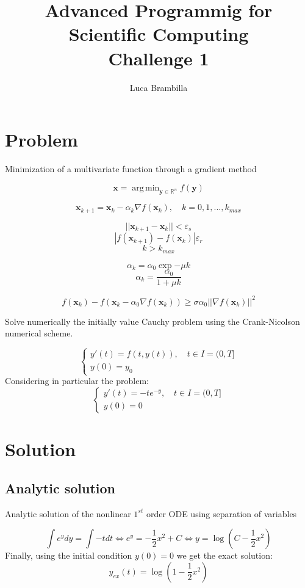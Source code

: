 \documentclass[]{article}
\title{Advanced Programmig for Scientific Computing\\Challenge 1}
\author{Luca Brambilla}
\DeclareMathOperator*{\argmin}{arg\,min}
\begin{document}
	
	\maketitle
	
	
\section{Problem}
Minimization of a multivariate function through a gradient method

$$\mathbf x = \argmin_{\mathbf y \in \mathbb R ^n} f(\mathbf y) $$

$$\mathbf x_{k+1} = \mathbf x_k - \alpha_k \nabla f(\mathbf x_k), \quad k=0,1,...,k_{max}$$

$$||\mathbf x_{k+1} - \mathbf x_k|| < \varepsilon_s$$
$$|f(\mathbf x_{k+1})-f(\mathbf x_k)| \varepsilon_r$$
$$k>k_{max}$$

$$\alpha_k = \alpha_0 \exp{-\mu k}$$
$$\alpha_k = \frac {\alpha_0}{1+\mu k}$$

\begin{equation}
	f(\mathbf x_k) - f(\mathbf x_k - \alpha_0\nabla f(\mathbf x_k)) \ge \sigma \alpha_0 ||\nabla f(\mathbf x_k)||^2
\end{equation}


Solve numerically the initially value Cauchy problem using the Crank-Nicolson numerical scheme.

$$
	\begin{cases}
		y'(t) = f(t, y(t)), \quad t \in I = (0, T] \\
		y(0) = y_0
	\end{cases}
$$
Considering in particular the problem:
$$
\begin{cases}
	y'(t) = -t e^{-y} , \quad t \in I = (0, T] \\
	y(0) = 0
\end{cases}
$$


\section{Solution}

\subsection{Analytic solution}
Analytic solution of the nonlinear $1^{st}$ order ODE using separation of variables

$$\int e^y dy = \int -t dt \Longleftrightarrow e^y = -\frac{1}{2} x^2 + C \Longleftrightarrow y = \log \left( C - \frac{1}{2} x^2 \right)$$
Finally, using the initial condition $y(0)=0$ we get the exact solution:
$$y_{ex} (t) = \log\left( 1 - \frac{1}{2} x^2 \right)$$
\end{document}
